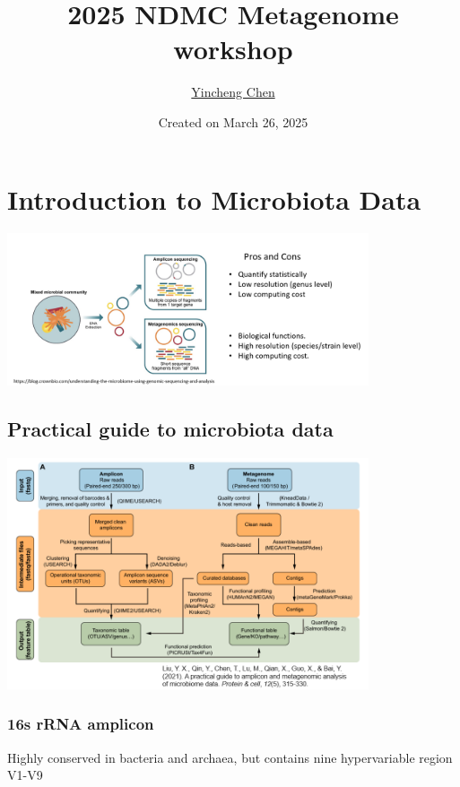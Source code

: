 \documentclass[
]{article}
\title{2025 NDMC Metagenome workshop}
\author{\href{https://yinchengchen23.github.io/myCV/}{Yincheng Chen}}
\date{Created on March 26, 2025}
\begin{document}
\maketitle

{
\setcounter{tocdepth}{2}
\tableofcontents
}
\hypertarget{introduction-to-microbiota-data}{%
\section{Introduction to Microbiota
Data}\label{introduction-to-microbiota-data}}

\includegraphics[width=0.8\textwidth,height=\textheight]{images/Fig1.png}

\hypertarget{practical-guide-to-microbiota-data}{%
\subsection{Practical guide to microbiota
data}\label{practical-guide-to-microbiota-data}}

\includegraphics[width=0.8\textwidth,height=\textheight]{images/Fig2.png}

\hypertarget{s-rrna-amplicon}{%
\subsubsection{16s rRNA amplicon}\label{s-rrna-amplicon}}

Highly conserved in bacteria and archaea, but contains nine
hypervariable region V1-V9
\end{document}
